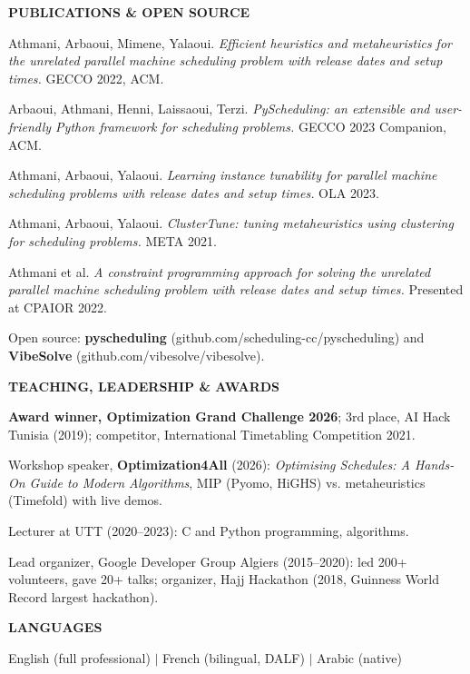 \documentclass[10pt,letterpaper]{article}
\newcommand{\cvsection}[1]{%
  \vspace{7pt}%
  {\color{accent}\large\bfseries\MakeUppercase{#1}}\par
  \vspace{-4pt}{\color{accent}\rule{\linewidth}{0.6pt}}\par
  \vspace{2pt}}
\newenvironment{cvitems}{%
  \begin{list}{\textbullet}{%
    \setlength{\leftmargin}{1.2em}\setlength{\labelwidth}{0.8em}%
    \setlength{\labelsep}{0.4em}\setlength{\itemsep}{1pt}%
    \setlength{\parsep}{0pt}\setlength{\topsep}{1pt}\setlength{\partopsep}{0pt}}%
  \small}{\end{list}}
\begin{document}
\cvsection{Publications \& Open Source}
\begin{cvitems}
  \item Athmani, Arbaoui, Mimene, Yalaoui. \textit{Efficient heuristics and metaheuristics for the unrelated
    parallel machine scheduling problem with release dates and setup times.} GECCO 2022, ACM.
  \item Arbaoui, Athmani, Henni, Laissaoui, Terzi. \textit{PyScheduling: an extensible and user-friendly
    Python framework for scheduling problems.} GECCO 2023 Companion, ACM.
  \item Athmani, Arbaoui, Yalaoui. \textit{Learning instance tunability for parallel machine scheduling
    problems with release dates and setup times.} OLA 2023.
  \item Athmani, Arbaoui, Yalaoui. \textit{ClusterTune: tuning metaheuristics using clustering for
    scheduling problems.} META 2021.
  \item Athmani et al. \textit{A constraint programming approach for solving the unrelated parallel machine
    scheduling problem with release dates and setup times.} Presented at CPAIOR 2022.
  \item Open source: \textbf{pyscheduling} (github.com/scheduling-cc/pyscheduling) and \textbf{VibeSolve}
    (github.com/vibesolve/vibesolve).
\end{cvitems}

\cvsection{Teaching, Leadership \& Awards}
\begin{cvitems}
  \item \textbf{Award winner, Optimization Grand Challenge 2026}; 3rd place, AI Hack Tunisia (2019); competitor,
    International Timetabling Competition 2021.
  \item Workshop speaker, \textbf{Optimization4All} (2026): \textit{Optimising Schedules: A Hands-On Guide to Modern
    Algorithms}, MIP (Pyomo, HiGHS) vs. metaheuristics (Timefold) with live demos.
  \item Lecturer at UTT (2020--2023): C and Python programming, algorithms.
  \item Lead organizer, Google Developer Group Algiers (2015--2020): led 200+ volunteers, gave 20+ talks;
    organizer, Hajj Hackathon (2018, Guinness World Record largest hackathon).
\end{cvitems}

\cvsection{Languages}
{\small English (full professional) \;$|$\; French (bilingual, DALF) \;$|$\; Arabic (native)\par}
\end{document}
